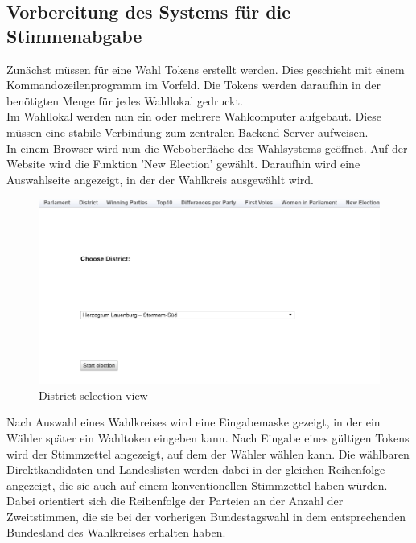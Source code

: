 \documentclass[a4paper]{scrreprt}
\begin{document}
\subsection{Vorbereitung des Systems für die Stimmenabgabe}

Zunächst müssen für eine Wahl Tokens erstellt werden.
Dies geschieht mit einem Kommandozeilenprogramm im Vorfeld.
Die Tokens werden daraufhin in der benötigten Menge für jedes Wahllokal gedruckt. \\

Im Wahllokal werden nun ein oder mehrere Wahlcomputer aufgebaut.
Diese müssen eine stabile Verbindung zum zentralen Backend-Server aufweisen. \\

In einem Browser wird nun die Weboberfläche des Wahlsystems geöffnet.
Auf der Website wird die Funktion 'New Election' gewählt.
Daraufhin wird eine Auswahlseite angezeigt, in der der Wahlkreis ausgewählt wird.\\

\begin{figure}[H]
\centering
\includegraphics[width=\textwidth]{images/select_district.png}
\caption {District selection view}
\end{figure}

Nach Auswahl eines Wahlkreises wird eine Eingabemaske gezeigt, in der ein Wähler später ein Wahltoken eingeben kann. Nach Eingabe eines gültigen Tokens wird der Stimmzettel angezeigt, auf dem der Wähler wählen kann. Die wählbaren Direktkandidaten und Landeslisten werden dabei in der gleichen Reihenfolge angezeigt, die sie auch auf einem konventionellen Stimmzettel haben würden. Dabei orientiert sich die Reihenfolge der Parteien an der Anzahl der Zweitstimmen, die sie bei der vorherigen Bundestagswahl in dem entsprechenden Bundesland des Wahlkreises erhalten haben. \\
\end{document}
